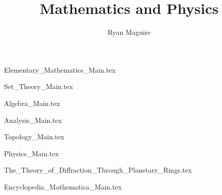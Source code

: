 \documentclass[crop=false,class=book,oneside]{standalone}
\title{Mathematics and Physics}
\author{Ryan Maguire}
\date{\vspace{-5ex}}
\begin{document}
    \maketitle
    \tableofcontents
    \listoffigures
    \listoftables
    \clearpage
    \newif\ifmain

        {Elementary_Mathematics_Main.tex}


        {Set_Theory_Main.tex}

        {Algebra_Main.tex}
    
        {Analysis_Main.tex}

        {Topology_Main.tex}


        {Physics_Main.tex}


        
                {The_Theory_of_Diffraction_Through_Planetary_Rings.tex}

        
               {Encyclopedia_Mathematica_Main.tex}

    \printglossary[type=\acronymtype]
    \clearpage
    \printglossary[style=long]
    \clearpage

    
\end{document}
